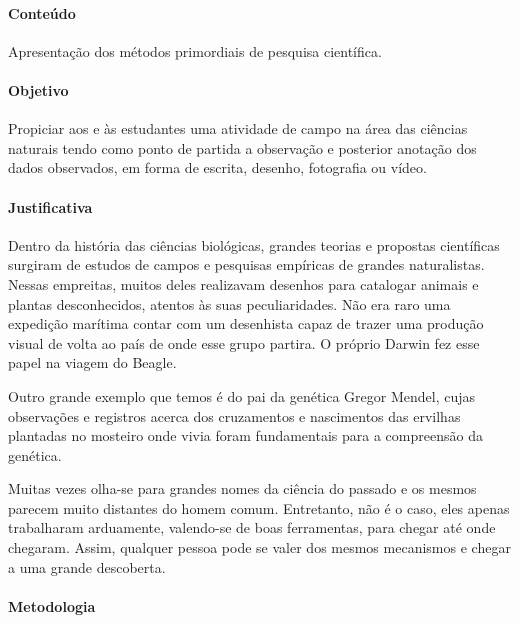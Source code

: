 \documentclass[11pt]{extarticle}
\begin{document}
\paragraph{Conteúdo} Apresentação dos métodos primordiais de pesquisa
científica.

\paragraph{Objetivo} Propiciar aos e às estudantes uma atividade de campo
na área das ciências naturais tendo como ponto de partida a observação
e posterior anotação dos dados observados, em forma de escrita, desenho,
fotografia ou vídeo. 

\paragraph{Justificativa} Dentro da história das ciências biológicas, grandes teorias e propostas
científicas surgiram de estudos de campos e pesquisas empíricas de grandes
naturalistas. Nessas empreitas, muitos deles realizavam desenhos para catalogar
animais e plantas desconhecidos, atentos às suas peculiaridades. Não era raro
uma expedição marítima contar com um desenhista capaz de trazer uma produção
visual de volta ao país de onde esse grupo partira. O próprio Darwin fez esse
papel na viagem do Beagle.

Outro grande exemplo que temos é do pai da genética Gregor Mendel, cujas
observações e registros acerca dos cruzamentos e nascimentos das ervilhas
plantadas no mosteiro onde vivia foram fundamentais para a compreensão da
genética.


Muitas vezes olha-se para grandes nomes da ciência do passado e os mesmos
parecem muito distantes do homem comum. Entretanto, não é o caso, eles apenas
trabalharam arduamente, valendo-se de boas ferramentas, para chegar até onde
chegaram. Assim, qualquer pessoa pode se valer dos mesmos mecanismos e chegar
a uma grande descoberta.

\paragraph{Metodologia}
\end{document}
